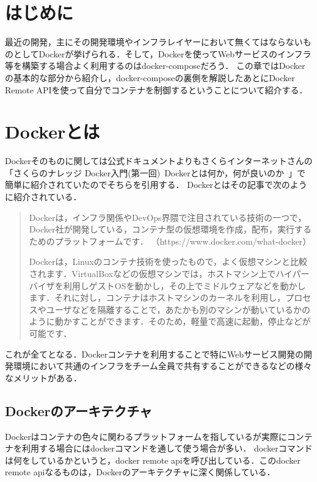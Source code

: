 \section{はじめに}

最近の開発，主にその開発環境やインフラレイヤーにおいて無くてはならないものとしてDockerが挙げられる．そして，Dockerを使ってWebサービスのインフラ等を構築する場合よく利用するのはdocker-composeだろう．
この章ではDockerの基本的な部分から紹介し，docker-composeの裏側を解説したあとにDocker Remote APIを使って自分でコンテナを制御するということについて紹介する．


\section{Dockerとは}

Dockerそのものに関しては公式ドキュメントよりもさくらインターネットさんの「さくらのナレッジ Docker入門(第一回)~Dockerとは何か，何が良いのか~」で簡単に紹介されていたのでそちらを引用する．
Dockerとはその記事で次のように紹介されている．\cite{sakura}

\begin{quote}
Dockerは，インフラ関係やDevOps界隈で注目されている技術の一つで，Docker社が開発している，コンテナ型の仮想環境を作成，配布，実行するためのプラットフォームです．
（https://www.docker.com/what-docker）

Dockerは，Linuxのコンテナ技術を使ったもので，よく仮想マシンと比較されます．VirtualBoxなどの仮想マシンでは，ホストマシン上でハイパーバイザを利用しゲストOSを動かし，その上でミドルウェアなどを動かします．それに対し，コンテナはホストマシンのカーネルを利用し，プロセスやユーザなどを隔離することで，あたかも別のマシンが動いているかのように動かすことができます．そのため，軽量で高速に起動，停止などが可能です．
\end{quote}

これが全てとなる．Dockerコンテナを利用することで特にWebサービス開発の開発環境において共通のインフラをチーム全員で共有することができるなどの様々なメリットがある．


\subsection{Dockerのアーキテクチャ}
Dockerはコンテナの色々に関わるプラットフォームを指しているが実際にコンテナを利用する場合にはdockerコマンドを通して使う場合が多い．
dockerコマンドは何をしているかというと，docker remote apiを呼び出している．このdocker remote apiなるものは，Dockerのアーキテクチャに深く関係している．


